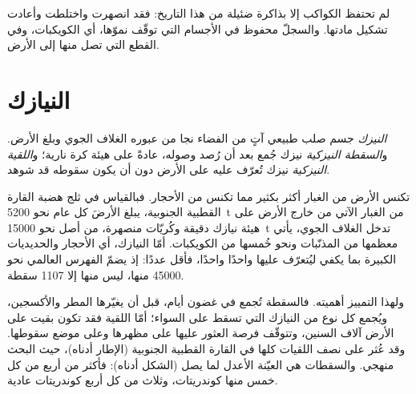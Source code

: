 لم تحتفظ الكواكب إلا بذاكرة ضئيلة من هذا التاريخ: فقد انصهرت واختلطت وأعادت
تشكيل مادتها. والسجلّ محفوظ في الأجسام التي توقّف نموّها، أي
الكويكبات، وفي القطع التي تصل منها إلى الأرض.

\section{النيازك}

\begin{definition}
\label{def:b2:planet-formation-meteorites:fall-find}
\emph{النيزك} جسم صلب طبيعي آتٍ من الفضاء
نجا من عبوره الغلاف الجوي وبلغ الأرض. و\emph{السقطة
النيزكية} نيزك جُمع بعد أن رُصد
وصوله، عادةً على هيئة كرة نارية؛ و\emph{اللقية
النيزكية} نيزك تُعرّف عليه على الأرض دون أن يكون
سقوطه قد شوهد.
\end{definition}

تكنس الأرض من الغبار أكثر بكثير مما تكنس من الأحجار. فبالقياس في ثلج
هضبة القارة القطبية الجنوبية، يبلغ الأرضَ كل عام نحو \qty{5200}{t} من الغبار
الآتي من خارج الأرض على هيئة نيازك دقيقة وكُريّات منصهرة، من أصل نحو
\qty{15000}{t} تدخل الغلاف الجوي، يأتي معظمها من المذنّبات ونحو
خُمسها من الكويكبات. أمّا النيازك، أي الأحجار والحديديات الكبيرة بما يكفي ليُتعرّف
عليها واحدًا واحدًا، فأقل عددًا: إذ يضمّ الفهرس العالمي نحو
\num{45000} منها، ليس منها إلا \num{1107} سقطة.

ولهذا التمييز أهميته. فالسقطة تُجمع في غضون أيام، قبل أن يغيّرها المطر
والأكسجين، ويُجمع كل نوع من النيازك التي تسقط على
السواء؛ أمّا اللقية فقد تكون بقيت على الأرض آلاف السنين، وتتوقّف
فرصة العثور عليها على مظهرها وعلى موضع سقوطها. وقد عُثر على نصف
اللقيات كلها في القارة القطبية الجنوبية (الإطار أدناه)، حيث البحث
منهجي. والسقطات هي العيّنة الأعدل لما يصل (الشكل أدناه):
فأكثر من أربع من كل خمس منها كوندريتات، وثلاث من كل أربع كوندريتات عادية.

